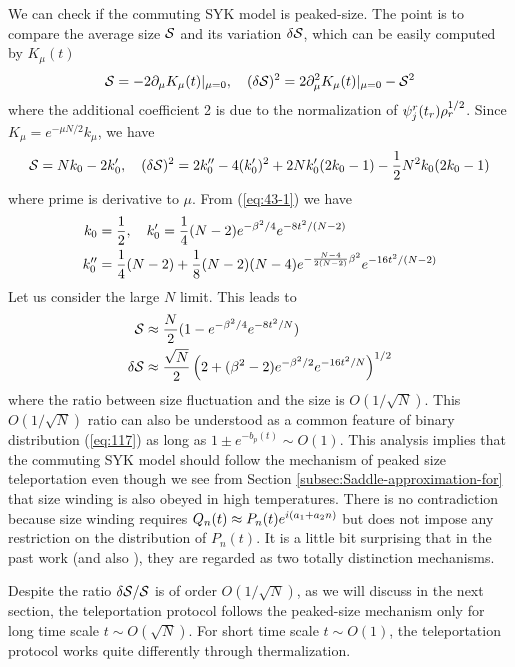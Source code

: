 \documentclass[11pt]{article}
\renewcommand{\>}{\rangle}
\newcommand{\<}{\langle}
\begin{document}
We can check if the commuting SYK model is peaked-size. The point
is to compare the average size $\mathcal{S}$ and its variation $\delta\mathcal{S}$,
which can be easily computed by $K_{\mu}(t)$ 
\begin{equation}
\mathcal{S}=-2\partial_{\mu}K_{\mu}(t)|_{\mu=0},\quad(\delta\mathcal{S})^{2}=2\partial_{\mu}^{2}K_{\mu}(t)|_{\mu=0}-\mathcal{S}^{2}
\end{equation}
where the additional coefficient 2 is due to the normalization of
$\psi_{j}^{r}(t_{r})\rho_{r}^{1/2}$. Since $K_{\mu}=e^{-\mu N/2}k_{\mu}$,
we have
\begin{equation}
\mathcal{S}=Nk_{0}-2k{}_{0}',\quad(\delta\mathcal{S})^{2}=2k_{0}''-4(k_{0}')^{2}+2Nk_{0}'(2k_{0}-1)-\frac{1}{2}N^{2}k_{0}(2k_{0}-1)
\end{equation}
where prime is derivative to $\mu$. From (\ref{eq:43-1}) we
have 
\begin{align}
k_{0} & =\frac{1}{2},\quad k_{0}'=\frac{1}{4}(N-2)e^{-\beta^{2}/4}e^{-8t^{2}/(N-2)}\\
k_{0}'' & =\frac{1}{4}(N-2)+\frac{1}{8}(N-2)(N-4)e^{-\frac{N-4}{2(N-2)}\beta^{2}}e^{-16t^{2}/(N-2)}
\end{align}
Let us consider the large $N$ limit. This leads to
\begin{align}
\mathcal{S} & \approx\frac{N}{2}(1-e^{-\beta^{2}/4}e^{-8t^{2}/N})\\
\delta\mathcal{S} & \approx\frac{\sqrt{N}}{2}\left(2+(\beta^{2}-2)e^{-\beta^{2}/2}e^{-16t^{2}/N}\right)^{1/2}
\end{align}
where the ratio between size fluctuation and the size is $O(1/\sqrt{N})$.
This $O(1/\sqrt{N})$ ratio can also be understood as a common feature
of binary distribution (\ref{eq:117}) as long as $1\pm e^{-b_{p}(t)}\sim O(1)$.
This analysis implies that the commuting SYK model should follow the mechanism of peaked
size teleportation even though we see from
Section \ref{subsec:Saddle-approximation-for} that size winding is
also obeyed in high temperatures. There is no contradiction because
size winding requires $Q_{n}(t)\approx P_{n}(t)e^{i(a_{1}+a_{2}n)}$
but does not impose any restriction on the distribution of $P_{n}(t)$.
It is a little bit surprising that in the past work \cite{Schuster:2021uvg} (and
also \cite{Brown:2019hmk, Nezami:2021yaq}), they are regarded as two totally distinction
mechanisms.

Despite the ratio $\delta\mathcal{S}/\mathcal{S}$ is of order $O(1/\sqrt{N})$, as we
will discuss in the next section, the teleportation protocol follows
the peaked-size mechanism only for long time scale $t\sim O(\sqrt{N})$.
For short time scale $t\sim O(1)$, the teleportation protocol works
quite differently through thermalization.
\end{document}
